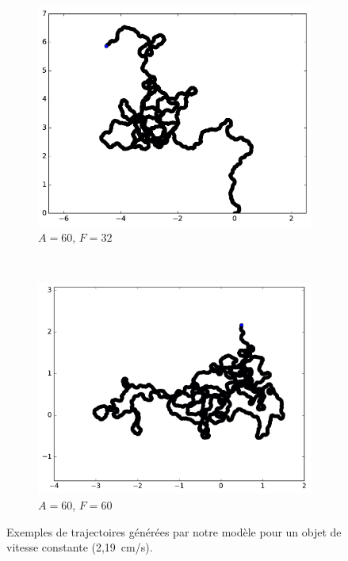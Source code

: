 \begin{figure}[htb]
\begin{subfigure}[t]{\subImgWmo}
			\includegraphics[width=\textwidth]{figures/ch3/synTraj_219_60_32}
			\caption[$A = 60$, $F=32$]{$A = 60$, $F=32$}
			\label{fig:synTraj_219_60_32}
		\end{subfigure}
		~
		\begin{subfigure}[t]{\subImgWmo}
			\centering
			\includegraphics[width=\textwidth]{figures/ch3/synTraj_219_60_60}
			\caption[$A = 60$, $F=60$]{$A = 60$, $F=60$}
			\label{fig:synTraj_219_60_60}
		\end{subfigure}
		\caption[Mouvements générés par notre modèle -- II]{Exemples de trajectoires générées par notre modèle pour un objet de vitesse constante (2,19~cm/s).}
		\label{fig:motion4560}
	\end{figure}
	
